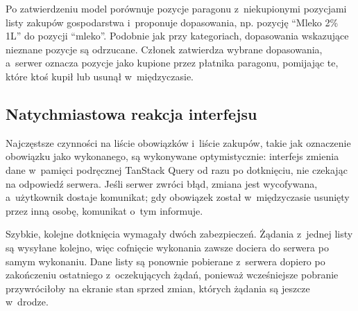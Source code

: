 Po zatwierdzeniu model porównuje pozycje paragonu z~niekupionymi pozycjami listy zakupów gospodarstwa i~proponuje dopasowania, np. pozycję \enquote{Mleko 2\% 1L} do pozycji \enquote{mleko}. Podobnie jak przy kategoriach, dopasowania wskazujące nieznane pozycje są odrzucane. Członek zatwierdza wybrane dopasowania, a~serwer oznacza pozycje jako kupione przez płatnika paragonu, pomijając te, które ktoś kupił lub usunął w~międzyczasie.


\subsection{Natychmiastowa reakcja interfejsu}

Najczęstsze czynności na liście obowiązków i~liście zakupów, takie jak oznaczenie obowiązku jako wykonanego, są wykonywane optymistycznie: interfejs zmienia dane w~pamięci podręcznej TanStack Query od razu po dotknięciu, nie czekając na odpowiedź serwera. Jeśli serwer zwróci błąd, zmiana jest wycofywana, a~użytkownik dostaje komunikat; gdy obowiązek został w~międzyczasie usunięty przez inną osobę, komunikat o~tym informuje.

Szybkie, kolejne dotknięcia wymagały dwóch zabezpieczeń. Żądania z~jednej listy są wysyłane kolejno, więc cofnięcie wykonania zawsze dociera do serwera po samym wykonaniu. Dane listy są ponownie pobierane z~serwera dopiero po zakończeniu ostatniego z~oczekujących żądań, ponieważ wcześniejsze pobranie przywróciłoby na ekranie stan sprzed zmian, których żądania są jeszcze w~drodze.

